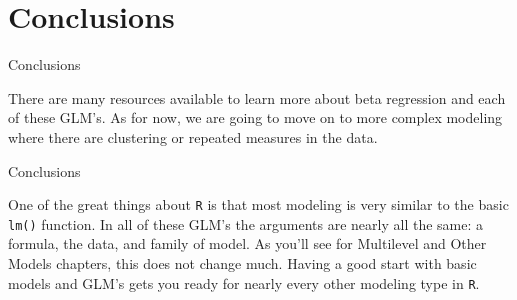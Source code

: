 \section{Conclusions}\label{conclusions}

\begin{frame}{Conclusions}

There are many resources available to learn more about beta regression
and each of these GLM's. As for now, we are going to move on to more
complex modeling where there are clustering or repeated measures in the
data.

\end{frame}

\begin{frame}[fragile]{Conclusions}

One of the great things about \texttt{R} is that most modeling is very
similar to the basic \texttt{lm()} function. In all of these GLM's the
arguments are nearly all the same: a formula, the data, and family of
model. As you'll see for Multilevel and Other Models chapters, this does
not change much. Having a good start with basic models and GLM's gets
you ready for nearly every other modeling type in \texttt{R}.

\end{frame}
